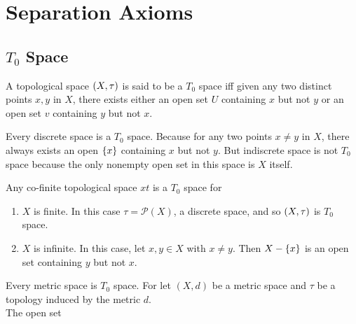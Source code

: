 \documentclass[../main-sheet.tex]{subfiles}
\begin{document}
\chapter{Separation Axioms}
\section{\(T_0\) Space}
\begin{defn}
    A topological space \((X, \tau)\) is said to be a \(T_0\) space iff given any two distinct points \(x,y\) in \(X\), there exists either an open set \(U\) containing \(x\) but not \(y\) or an open set \(v\) containing \(y\) but not \(x\).
\end{defn}
\begin{ex}
    Every discrete space is a \(T_0\) space. Because for any two points \(x\neq y\) in \(X\), there always exists an open \(\left\{x\right\}\) containing \(x\) but not \(y\). But indiscrete space is not \(T_0\) space because the only nonempty open set in this space is \(X\) itself.
\end{ex}
\begin{ex}
    Any co-finite topological space \(xt\) is a \(T_0\) space for 
    \begin{enumerate}[label={Case \roman*.}]
        \item \(X\) is finite. In this case \(\tau=\mathcal{P}(X)\), a discrete space, and so \((X, \tau)\) is \(T_0\) space.
        \item \(X\) is infinite. In this case, let \(x,y\in X\) with \(x\neq y\). Then \(X-\left\{x\right\} \) is an open set containing \(y \) but not \(x\).
    \end{enumerate}
\end{ex}
\begin{ex}
    Every metric space is \(T_0\) space. For let \((X,d)\) be a metric space and \(\tau\) be a topology induced by the metric \(d\).\\ The open set
\end{ex}
\end{document}
